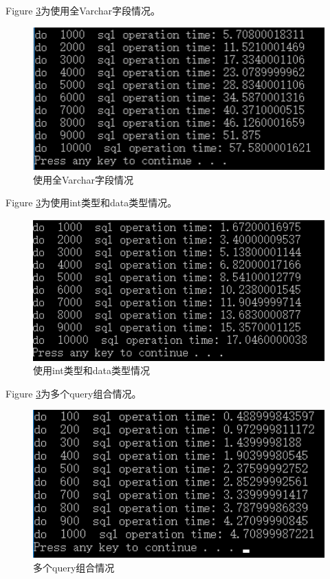 Figure \ref{fig:sys.param}为使用全Varchar字段情况。
\begin{figure}[H]
\begin{center}
\includegraphics[width=16cm]{img//Varchar.PNG}
\caption{使用全Varchar字段情况}
\label{fig:sys.param}
\end{center}
\end{figure}

Figure \ref{fig:sys.param}为使用int类型和data类型情况。
\begin{figure}[H]
\begin{center}
\includegraphics[width=16cm]{img//int_data.PNG}
\caption{使用int类型和data类型情况}
\label{fig:sys.param}
\end{center}
\end{figure}

Figure \ref{fig:sys.param}为多个query组合情况。
\begin{figure}[H]
\begin{center}
\includegraphics[width=16cm]{img//multi_query.PNG}
\caption{多个query组合情况}
\label{fig:sys.param}
\end{center}
\end{figure}

